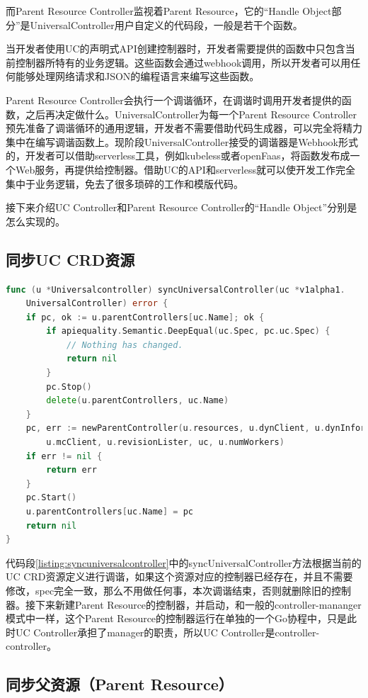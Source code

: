 \documentclass[macfonts,master]{njuthesis}
\begin{document}
而Parent Resource Controller监视着Parent Resource，它的``Handle Object部分''是UniversalController用户自定义的代码段，一般是若干个函数。

当开发者使用UC的声明式API创建控制器时，开发者需要提供的函数中只包含当前控制器所特有的业务逻辑。这些函数会通过webhook调用，所以开发者可以用任何能够处理网络请求和JSON的编程语言来编写这些函数。

Parent Resource Controller会执行一个调谐循环，在调谐时调用开发者提供的函数，之后再决定做什么。UniversalController为每一个Parent Resource Controller预先准备了调谐循环的通用逻辑，开发者不需要借助代码生成器，可以完全将精力集中在编写调谐函数上。现阶段UniversalController接受的调谐器是Webhook形式的，开发者可以借助serverless工具，例如kubeless或者openFaas，将函数发布成一个Web服务，再提供给控制器。借助UC的API和serverless就可以使开发工作完全集中于业务逻辑，免去了很多琐碎的工作和模版代码。

接下来介绍UC Controller和Parent Resource Controller的``Handle Object''分别是怎么实现的。

\subsection{同步UC CRD资源}
\begin{lstlisting}[language=Go,caption=同步UC CRD,label=listing:syncuniversalcontroller]
func (u *Universalcontroller) syncUniversalController(uc *v1alpha1.
	UniversalController) error {
	if pc, ok := u.parentControllers[uc.Name]; ok {
		if apiequality.Semantic.DeepEqual(uc.Spec, pc.uc.Spec) {
			// Nothing has changed.
			return nil
		}
		pc.Stop()
		delete(u.parentControllers, uc.Name)
	}
	pc, err := newParentController(u.resources, u.dynClient, u.dynInformers, 
		u.mcClient, u.revisionLister, uc, u.numWorkers)
	if err != nil {
		return err
	}
	pc.Start()
	u.parentControllers[uc.Name] = pc
	return nil
}
\end{lstlisting}

代码段\ref{listing:syncuniversalcontroller}中的syncUniversalController方法根据当前的UC CRD资源定义进行调谐，如果这个资源对应的控制器已经存在，并且不需要修改，spec完全一致，那么不用做任何事，本次调谐结束，否则就删除旧的控制器。接下来新建Parent Resource的控制器，并启动，和一般的controller-mananger模式中一样，这个Parent Resource的控制器运行在单独的一个Go协程中，只是此时UC Controller承担了manager的职责，所以UC Controller是controller-controller。

\subsection{同步父资源（Parent Resource）}
\end{document}
